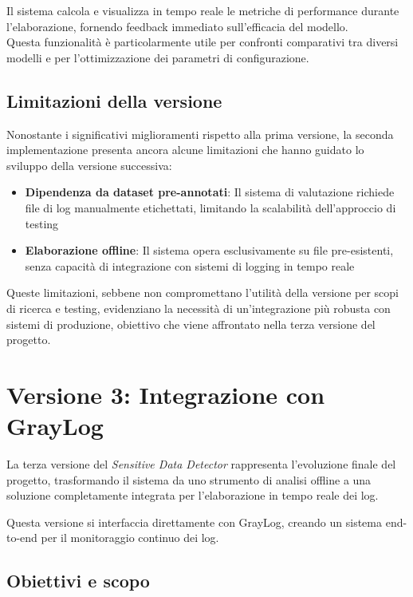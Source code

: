 \documentclass[12pt]{report}
\begin{document}
Il sistema calcola e visualizza in tempo reale le metriche di performance durante l'elaborazione, fornendo feedback immediato sull'efficacia del modello. \\
Questa funzionalità è particolarmente utile per confronti comparativi tra diversi modelli e per l'ottimizzazione dei parametri di configurazione.

\subsection{Limitazioni della versione}
\label{subsec:ver2_limitazioni}

Nonostante i significativi miglioramenti rispetto alla prima versione, la seconda implementazione presenta ancora alcune limitazioni che hanno guidato lo sviluppo della versione successiva:

\begin{itemize}
    \item \textbf{Dipendenza da dataset pre-annotati}: Il sistema di valutazione richiede file di log manualmente etichettati, limitando la scalabilità dell'approccio di testing
    \item \textbf{Elaborazione offline}: Il sistema opera esclusivamente su file pre-esistenti, senza capacità di integrazione con sistemi di logging in tempo reale
\end{itemize}

Queste limitazioni, sebbene non compromettano l'utilità della versione per scopi di ricerca e testing, evidenziano la necessità di un'integrazione più robusta con sistemi di produzione, obiettivo che viene affrontato nella terza versione del progetto.

\section{Versione 3: Integrazione con GrayLog}
\label{sec:ver3}

La terza versione del \textit{Sensitive Data Detector} rappresenta l'evoluzione finale del progetto, trasformando il sistema da uno strumento di analisi offline a una soluzione completamente integrata per l'elaborazione in tempo reale dei log.

Questa versione si interfaccia direttamente con GrayLog, creando un sistema end-to-end per il monitoraggio continuo dei log.

\subsection{Obiettivi e scopo}
\label{subsec:ver3_obiettivi}
\end{document}
